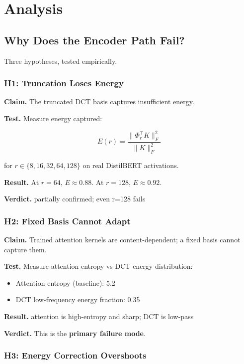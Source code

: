 
\section{Analysis}

\subsection{Why Does the Encoder Path Fail?}

Three hypotheses, tested empirically.

\subsubsection{H1: Truncation Loses Energy}

\textbf{Claim.} The truncated DCT basis captures insufficient energy.

\textbf{Test.} Measure energy captured:

\[
E(r) = \frac{\|\Phi_r^\top K\|_F^2}{\|K\|_F^2}
\]

for $r \in \{8, 16, 32, 64, 128\}$ on real DistilBERT activations.

\textbf{Result.} At $r = 64$, $E \approx 0.88$. At $r = 128$, $E \approx 0.92$.

\textbf{Verdict.} partially confirmed; even r=128 fails

\subsubsection{H2: Fixed Basis Cannot Adapt}

\textbf{Claim.} Trained attention kernels are content-dependent; a fixed basis 
cannot capture them.

\textbf{Test.} Measure attention entropy vs DCT energy distribution:

\begin{itemize}
\item Attention entropy (baseline): 5.2
\item DCT low-frequency energy fraction: 0.35

\end{itemize}
\textbf{Result.} attention is high-entropy and sharp; DCT is low-pass

\textbf{Verdict.} This is the \textbf{primary failure mode}.

\subsubsection{H3: Energy Correction Overshoots}

